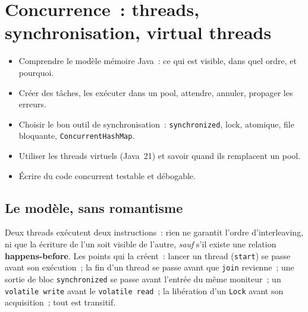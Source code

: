\documentclass[12pt,a4paper,twoside,openright]{book}
\begin{document}
\chapter{Concurrence~: threads, synchronisation, virtual threads}
\label{ch-java-concurrency}

\begin{objectif}
\begin{itemize}
  \item Comprendre le mod\`ele m\'emoire Java~: ce qui est visible, dans quel ordre, et pourquoi.
  \item Cr\'eer des t\^aches, les ex\'ecuter dans un pool, attendre, annuler, propager les erreurs.
  \item Choisir le bon outil de synchronisation~: \texttt{synchronized}, lock, atomique,
        file bloquante, \texttt{ConcurrentHashMap}.
  \item Utiliser les threads virtuels (Java~21) et savoir quand ils remplacent un pool.
  \item \'Ecrire du code concurrent testable et d\'ebogable.
\end{itemize}
\end{objectif}

\section{Le mod\`ele, sans romantisme}

Deux threads ex\'ecutent deux instructions~: rien ne garantit l'ordre d'interleaving, ni que la
\'ecriture de l'un soit visible de l'autre, \emph{sauf} s'il existe une relation
\textbf{happens-before}. Les points qui la cr\'eent~: lancer un thread (\verb|start|) se passe
avant son ex\'ecution~; la fin d'un thread se passe avant que \verb|join| revienne~; une sortie de
bloc \verb|synchronized| se passe avant l'entr\'ee du m\^eme moniteur~; un \verb|volatile write| avant
le \verb|volatile read|~; la lib\'eration d'un \verb|Lock| avant son acquisition~; tout est transitif.
\end{document}
